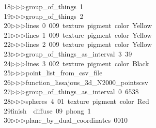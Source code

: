 \begin{tabbing}
18\>$\triangleright$\>$\triangleright$\>$\triangleright$\>group\_of\_things\ 1\ \\[0pt]
19\>$\triangleright$\>$\triangleright$\>$\triangleright$\>group\_of\_things\ 2\ \\[0pt]
20\>$\triangleright$\>$\triangleright$\>$\triangleright$\>lines\ 0\ 009\ texture\ pigment\ color\ Yellow\ \ \ \\[0pt]
21\>$\triangleright$\>$\triangleright$\>$\triangleright$\>lines\ 1\ 009\ texture\ pigment\ color\ Yellow\ \ \ \\[0pt]
22\>$\triangleright$\>$\triangleright$\>$\triangleright$\>lines\ 2\ 009\ texture\ pigment\ color\ Yellow\ \ \ \\[0pt]
23\>$\triangleright$\>$\triangleright$\>$\triangleright$\>group\_of\_things\_as\_interval\ 3\ 39\ \\[0pt]
24\>$\triangleright$\>$\triangleright$\>$\triangleright$\>lines\ 3\ 002\ texture\ pigment\ color\ Black\ \ \ \\[0pt]
25\>$\triangleright$\>$\triangleright$\>$\triangleright$\>point\_list\_from\_csv\_file\ \\[0pt]
26\>$\triangleright$\>$\triangleright$\>$\triangleright$\>function\_lissajous\_3d\_N2000\_pointscsv\ \\[0pt]
27\>$\triangleright$\>$\triangleright$\>$\triangleright$\>group\_of\_things\_as\_interval\ 0\ 6538\\[0pt]
28\>$\triangleright$\>$\triangleright$\>$\triangleright$\>spheres\ 4\ 01\ texture\ pigment\ color\ Red\ \ \\[0pt]
29\>finish\ \ diffuse\ 09\ phong\ 1\ \\[0pt]
30\>$\triangleright$\>$\triangleright$\>$\triangleright$\>plane\_by\_dual\_coordinates\ 0010\ \\[0pt]

\end{tabbing}
